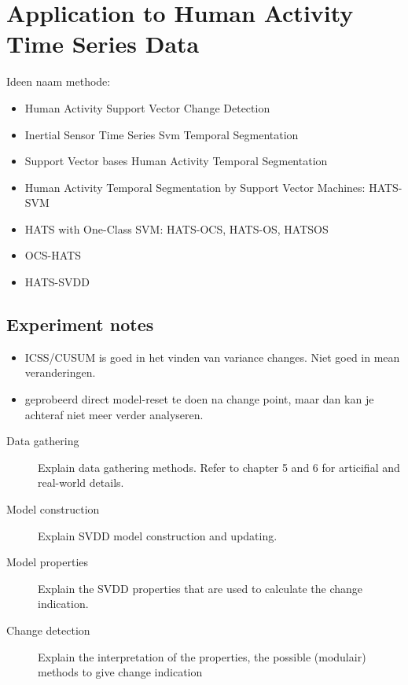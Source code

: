 
\chapter{Application to Human Activity Time Series Data}

\label{Chapter4} %



Ideen naam methode:
\begin{itemize}
  \item Human Activity Support Vector Change Detection
  \item Inertial Sensor Time Series Svm Temporal Segmentation
  \item Support Vector bases Human Activity Temporal Segmentation
  \item Human Activity Temporal Segmentation by Support Vector Machines: HATS-SVM
  \item HATS with One-Class SVM: HATS-OCS, HATS-OS, HATSOS
  \item OCS-HATS
  \item HATS-SVDD
\end{itemize}

\section{Experiment notes}
\begin{itemize}
  \item ICSS/CUSUM is goed in het vinden van variance changes. Niet goed in mean veranderingen.
  \item geprobeerd direct model-reset te doen na change point, maar dan kan je achteraf niet meer verder analyseren.
\end{itemize}


\begin{description}
  \item[Data gathering] Explain data gathering methods. Refer to chapter 5 and 6 for articifial and real-world details.
  \item[Model construction] Explain SVDD model construction and updating.
  \item[Model properties] Explain the SVDD properties that are used to calculate the change indication.
  \item[Change detection] Explain the interpretation of the properties, the possible (modulair) methods to give change indication
\end{description}


